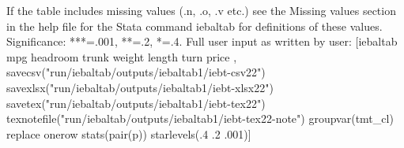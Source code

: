 If the table includes missing values (.n, .o, .v etc.) see the Missing values section in the help file for the Stata command iebaltab for definitions of these values. Significance: ***=.001, **=.2, *=.4. Full user input as written by user: [iebaltab mpg headroom trunk weight length turn price , savecsv("run/iebaltab/outputs/iebaltab1/iebt-csv22") savexlsx("run/iebaltab/outputs/iebaltab1/iebt-xlsx22") savetex("run/iebaltab/outputs/iebaltab1/iebt-tex22") texnotefile("run/iebaltab/outputs/iebaltab1/iebt-tex22-note") groupvar(tmt\_cl) replace onerow stats(pair(p)) starlevels(.4 .2 .001)] 

